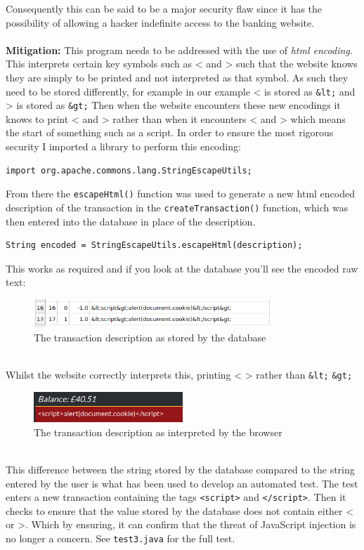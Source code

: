 Consequently this can be said to be a major security flaw since it has the possibility of allowing a hacker indefinite access to the banking website.\\ \\
\textbf{Mitigation:} This program needs to be addressed with the use of \textit{html encoding}. This interprets certain key symbols such as < and > such that the website knows
they are simply to be printed and not interpreted as that symbol. As such they need to be stored differently, for example in our example < is stored as \verb|&lt;| and > is stored as
\verb|&gt;| Then when the website encounters these new encodings it knows to print < and > rather than when it encounters < and > which means the start of something such as a
script. In order to ensure the most rigorous security I imported a library to perform this encoding:
\begin{verbatim}
import org.apache.commons.lang.StringEscapeUtils;
\end{verbatim}
From there the \verb|escapeHtml()| function was used to generate a new html encoded description of the transaction in the \verb|createTransaction()| function, which was then
entered into the database in place of the description.
\begin{verbatim}
String encoded = StringEscapeUtils.escapeHtml(description);
\end{verbatim}
This works as required and if you look at the database you'll see the encoded raw text:
\begin{figure}[h]
  \centering
  \includegraphics[width=0.8\textwidth]{figs/database.png}
  \caption{The transaction description as stored by the database}
  \label{fig2}
\end{figure}\\
Whilst the website correctly interprets this, printing < > rather than \verb|&lt;| \verb|&gt;|
\begin{figure}[h]
  \centering
  \includegraphics[width=0.5\textwidth]{figs/websitejs.png}
  \caption{The transaction description as interpreted by the browser}
  \label{fig3}
\end{figure}\\
This difference between the string stored by the database compared to the string entered by the user is what has been used to develop an automated test. The test enters a new
transaction containing the tags \verb|<script>| and \verb|</script>|. Then it checks to ensure that the value stored by the database does not contain either < or >. Which by
ensuring, it can confirm that the threat of JavaScript injection is no longer a concern. See \verb|test3.java| for the full test.